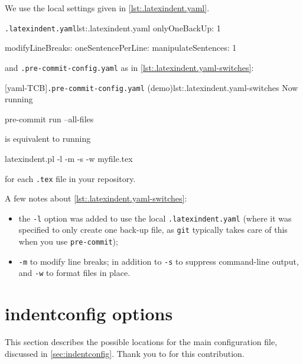 \documentclass[10pt]{article}
\begin{document}
  \begin{example}
  We use the local settings given in \cref{lst:.latexindent.yaml}.
  \begin{cmhlistings}[style=tcblatex]{\texttt{.latexindent.yaml}}{lst:.latexindent.yaml}
onlyOneBackUp: 1

modifyLineBreaks:
 oneSentencePerLine:
   manipulateSentences: 1
\end{cmhlistings}

  and \texttt{.pre-commit-config.yaml} as in \cref{lst:.latexindent.yaml-switches}:

  [yaml-TCB]{\texttt{.pre-commit-config.yaml} (demo)}{lst:.latexindent.yaml-switches}
  Now running

  \begin{commandshell}
pre-commit run --all-files
\end{commandshell}

  is equivalent to running

  \begin{commandshell}
latexindent.pl -l -m -s -w myfile.tex
\end{commandshell}

  for each \texttt{.tex} file in your repository.

  A few notes about \cref{lst:.latexindent.yaml-switches}:
  \begin{itemize}
   \item the \texttt{-l} option was added to use the local \texttt{.latexindent.yaml}
         (where it was specified to only create one back-up file, as \texttt{git}
         typically takes care of this when you use \texttt{pre-commit});
   \item \texttt{-m} to modify line breaks; in addition to \texttt{-s} to suppress command-line
         output, and \texttt{-w} to format files in place.
  \end{itemize}
  \end{example}

 \section{indentconfig options}\label{app:indentconfig:options}
  This section describes the possible locations for the main configuration file,
  discussed in \cref{sec:indentconfig}. Thank you to \cite{nehctargl} for this
  contribution. 
\end{document}
